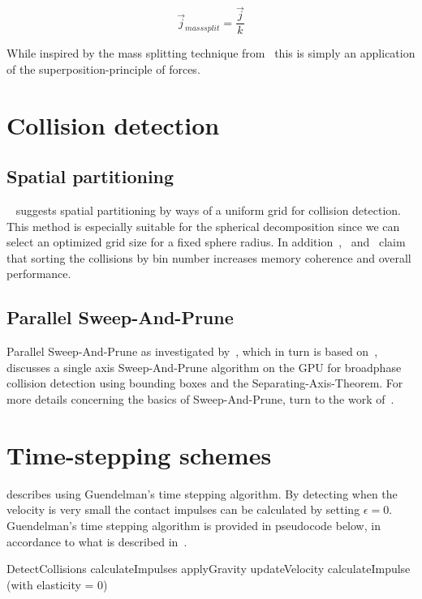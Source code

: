 \begin{equation}
  \vec{j}_{mass split} = \frac{\vec{j}}{k}
\end{equation}

While inspired by the mass splitting technique from~\cite{tonge}
this is simply an application of the superposition-principle
of forces.

\section{Collision detection}\label{sec:gridCD}
\subsection{Spatial partitioning}
~\cite{gpugems} suggests spatial partitioning
by ways of a uniform grid for collision detection. This method is especially suitable
for the spherical decomposition since we can select an optimized
grid size for a fixed sphere radius. In addition~\cite{gpugems},~\cite{green} and~\cite{fastnearest} claim that sorting
the collisions by bin number increases memory coherence and overall performance.

\subsection{Parallel Sweep-And-Prune}
Parallel Sweep-And-Prune as investigated by~\cite{gpupipedev}, which in turn is based on~\cite{liu2010}, %
discusses a single axis Sweep-And-Prune algorithm on the GPU for broadphase collision
detection using bounding boxes and the Separating-Axis-Theorem. For more details
concerning the basics of Sweep-And-Prune, turn to the work of~\cite{SAPPierre}.

\section{Time-stepping schemes}
\cite{Lembcke} describes using Guendelman's time stepping
algorithm. By detecting when the velocity is very small the contact impulses can be
calculated by setting $\epsilon = 0$.
Guendelman's time stepping algorithm is provided in pseudocode below, in accordance
to what is described in~\cite{guendelman}.

\begin{algorithm}[H]
  \begin{algorithmic}[1]
  \State DetectCollisions
    \State calculateImpulses
  \EndFor
  \State applyGravity
  \State updateVelocity
      \State calculateImpulse (with elasticity = 0)
    \EndFor
\end{algorithmic}
\end{algorithm}

